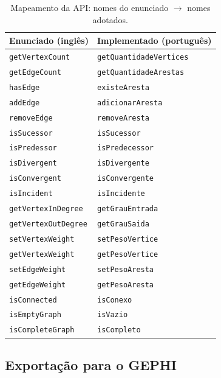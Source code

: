 \documentclass[12pt]{article}
\begin{document}
\begin{table}[H]
\centering
\caption{Mapeamento da API: nomes do enunciado $\rightarrow$ nomes adotados.}
\label{tab:api}
\begin{tabular}{ll}
\toprule
\textbf{Enunciado (inglês)} & \textbf{Implementado (português)} \\
\midrule
\texttt{getVertexCount}    & \texttt{getQuantidadeVertices} \\
\texttt{getEdgeCount}      & \texttt{getQuantidadeArestas} \\
\texttt{hasEdge}           & \texttt{existeAresta} \\
\texttt{addEdge}           & \texttt{adicionarAresta} \\
\texttt{removeEdge}        & \texttt{removeAresta} \\
\texttt{isSucessor}        & \texttt{isSucessor} \\
\texttt{isPredessor}       & \texttt{isPredecessor} \\
\texttt{isDivergent}       & \texttt{isDivergente} \\
\texttt{isConvergent}      & \texttt{isConvergente} \\
\texttt{isIncident}        & \texttt{isIncidente} \\
\texttt{getVertexInDegree} & \texttt{getGrauEntrada} \\
\texttt{getVertexOutDegree}& \texttt{getGrauSaida} \\
\texttt{setVertexWeight}   & \texttt{setPesoVertice} \\
\texttt{getVertexWeight}   & \texttt{getPesoVertice} \\
\texttt{setEdgeWeight}     & \texttt{setPesoAresta} \\
\texttt{getEdgeWeight}     & \texttt{getPesoAresta} \\
\texttt{isConnected}       & \texttt{isConexo} \\
\texttt{isEmptyGraph}      & \texttt{isVazio} \\
\texttt{isCompleteGraph}   & \texttt{isCompleto} \\
\bottomrule
\end{tabular}
\end{table}

\subsection{Exportação para o GEPHI}
\end{document}
